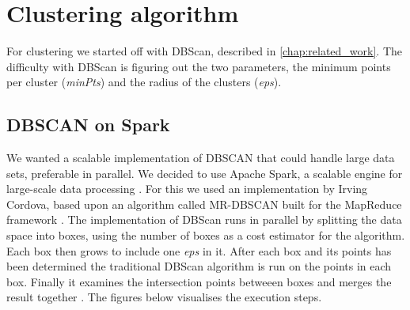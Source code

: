 \section{Clustering algorithm}

For clustering we started off with DBScan, described in \autoref{chap:related_work}. The difficulty with DBScan is figuring out the two parameters, the minimum points per cluster (\textit{minPts}) and the radius of the clusters (\textit{eps}). 

\subsection{DBSCAN on Spark}

We wanted a scalable implementation of DBSCAN that could handle large data sets, preferable in parallel. We decided to use Apache Spark, a scalable engine for large-scale data processing \cite{spark}. For this we used an implementation by Irving Cordova, based upon an algorithm called MR-DBSCAN built for the MapReduce framework \cite{dbscan_on_spark}. The implementation of DBScan runs in parallel by splitting the data space into boxes, using the number of boxes as a cost estimator for the algorithm. Each box then grows to include one \textit{eps} in it. After each box and its points has been determined the traditional DBScan algorithm is run on the points in each box. Finally it examines the intersection points betweeen boxes and merges the result together \cite{vis_dbscan_on_spark}. The figures below visualises the execution steps.

